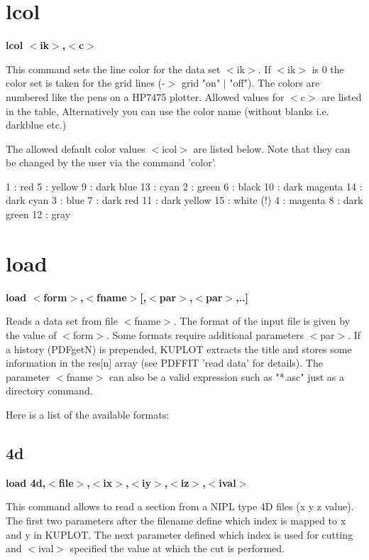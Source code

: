 \section{lcol}
{\bf lcol $ <$ik$> $,$ <$c$> $ \par }
\par
\vspace{3pt}
This command sets the line color for the data set $ <$ik$> $. If $ <$ik$> $ is 
0 the color set is taken for the grid lines (-$> $ grid "on" $| $ "off"). 
The colors are numbered like the pens on a HP7475 plotter. Allowed 
values for $ <$c$> $ are listed in the table, Alternatively you can use 
the color name (without blanks i.e. darkblue etc.) 
\par
The allowed default color values $ <$icol$> $ are listed below. Note 
that they can be changed by the user via the command 'color'. 
\par
\begin{MacVerbatim}
  1 : red       5 : yellow        9 : dark blue      13 : cyan
  2 : green     6 : black        10 : dark magenta   14 : dark cyan
  3 : blue      7 : dark red     11 : dark yellow    15 : white (!)
  4 : magenta   8 : dark green   12 : gray
\end{MacVerbatim}
\section{load}
{\bf load $ <$form$> $,$ <$fname$> $[,$ <$par$> $,$ <$par$> $,..] \par }
\par
\vspace{3pt}
Reads a data set from file $ <$fname$> $. The format of the input file 
is given by the value of $ <$form$> $. Some formats require additional 
parameters $ <$par$> $. If a history (PDFgetN) is prepended, KUPLOT 
extracts the title and stores some information in the res[n] 
array (see PDFFIT 'read data' for details). The parameter $ <$fname$> $ 
can also be a valid expression such as "*.asc" just as a directory 
command. 
\par
Here is a list of the available formats: 
\par
\subsection*{4d}
{\bf load 4d,$ <$file$> $,$ <$ix$> $,$ <$iy$> $,$ <$iz$> $,$ <$ival$> $ \par }
\par
\vspace{3pt}
This command allows to read a section from a NIPL type 4D files 
(x y z value). The first two parameters after the filename define 
which index is mapped to x and y in KUPLOT. The next parameter 
defined which index is used for cutting and $ <$ival$> $ specified the 
value at which the cut is performed. 

